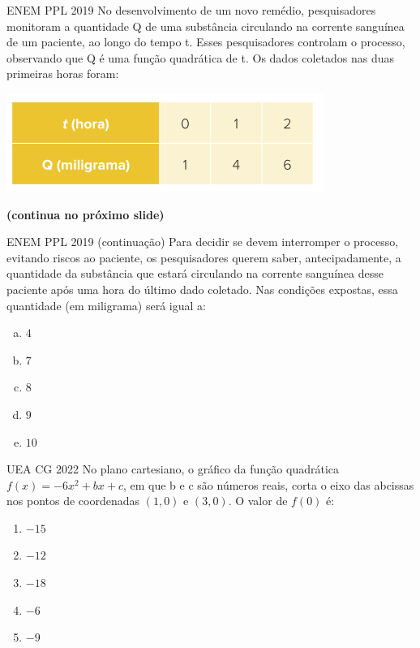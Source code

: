 \documentclass[11pt]{beamer}
\begin{document}
\begin{frame}{ENEM PPL 2019}
    No desenvolvimento de um novo remédio, pesquisadores monitoram a quantidade Q de uma substância circulando na corrente sanguínea de um paciente, ao longo do tempo t. Esses pesquisadores controlam o processo, observando que Q é uma função quadrática de t. Os dados coletados nas duas primeiras horas foram:

    \begin{center}
        \includegraphics[scale=0.5]{imagens/enem-ppl-2019.png}
    \end{center} \textbf{(continua no próximo slide)}
\end{frame}

\begin{frame}{ENEM PPL 2019 (continuação)}
    Para decidir se devem interromper o processo, evitando riscos ao paciente, os pesquisadores querem saber, antecipadamente, a quantidade da substância que estará circulando na corrente sanguínea desse paciente após uma hora do último dado coletado. Nas condições expostas, essa quantidade (em miligrama) será igual a:

    \begin{enumerate}[a)]
        \item $4$
        \item $7$ %
        \item $8$ 
        \item $9$ 
        \item $10$ 
    \end{enumerate}
\end{frame}

\begin{frame}{UEA CG 2022}
    No plano cartesiano, o gráfico da função quadrática $f(x)=-6x^{2}+bx+c$, em que b e c são números reais, corta o eixo das abcissas nos pontos de coordenadas $(1,0)$ e $(3,0)$. O valor de $f(0)$ é:

    \begin{enumerate}[a]
        \item $-15$
        \item $-12$ 
        \item $-18$ %
        \item $-6$ 
        \item $-9$ 
    \end{enumerate}
\end{frame}
\end{document}
